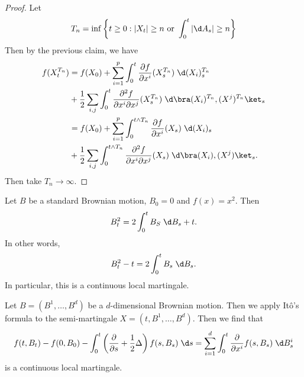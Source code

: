 \documentclass[a4paper]{article}
\begin{document}
\begin{proof}
  Let
  \[
    T_n = \inf \left\{t \geq 0: |X_t| \geq n\text{ or }\int_0^t |\d A_s| \geq n\right\}
  \]
  Then by the previous claim, we have
  \begin{align*}
    f(X_t^{T_n}) &= f(X_0) + \sum_{i = 1}^p \int_0^t \frac{\partial f}{\partial x^i} (X_s^{T_n})\;\d (X_i)_s^{T_n} \\
    &+ \frac{1}{2} \sum_{i, j} \int_0^t \frac{\partial^2 f}{\partial x^i \partial x^j} (X_s^{T_n})\;\d \bra (X_i)^{T_n}, (X^j)^{T_n}\ket_s\\
    &= f(X_0) + \sum_{i = 1}^p \int_0^{t \wedge T_n} \frac{\partial f}{\partial x^i} (X_s)\;\d (X_i)_s \\
    &+ \frac{1}{2} \sum_{i, j} \int_0^{t \wedge T_n} \frac{\partial^2 f}{\partial x^i \partial x^j} (X_s)\;\d \bra (X_i), (X^j)\ket_s.
  \end{align*}
  Then take $T_n \to \infty$.
\end{proof}

\begin{eg}
  Let $B$ be a standard Brownian motion, $B_0 = 0$ and $f(x) = x^2$. Then
  \[
    B_t^2 = 2 \int_0^t B_S \;\d B_s + t.
  \]
  In other words,
  \[
    B_t^2 - t = 2 \int_0^t B_s\;\d B_s.
  \]
  In particular, this is a continuous local martingale.
\end{eg}

\begin{eg}
  Let $B = (B^1, \ldots, B^d)$ be a $d$-dimensional Brownian motion. Then we apply It\^o's formula to the semi-martingale $X = (t, B^1, \ldots, B^d)$. Then we find that
  \[
    f(t, B_t) - f(0, B_0) - \int_0^t \left(\frac{\partial}{\partial s} + \frac{1}{2} \Delta\right) f(s, B_s) \;\d s = \sum_{i = 1}^d \int_0^t \frac{\partial}{\partial x^i} f(s, B_s)\;\d B_s^i
  \]
  is a continuous local martingale.
\end{eg}
\end{document}
